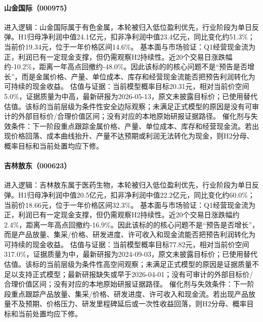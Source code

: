 \paragraph{山金国际（000975）}
进入逻辑：山金国际属于有色金属，本轮被归入低位盈利优先，行业阶段为单日反弹。H1归母净利润中值24.1亿元，扣非净利润中值23.4亿元，同比变化约51.3\%；当前价19.34元，位于一年价格区间14.6\%。
基本面与市场验证：Q1经营现金流为正，利润已有一定现金支撑，但仍需观察H2持续性。近20个交易日涨跌幅约-10.2\%，距离一年高点回撤约-48.0\%。因此该标的的核心问题不是“预告是否增长”，而是金属价格、产量、单位成本、库存和经营现金流能否把预告利润转化为可持续的现金收益。
估值与证据：当前模型概率目标20.31元，相对当前价空间5.0\%，证据质量为中高，最新研报为2026-05-13，原文未披露目标价；已使用替代估值。该标的当前层级为条件性安全边际观察；未满足正式模型的原因是没有可审计的外部目标价/合理价值区间；没有对应的本地原始研报证据路径。
催化剂与失效条件：下一阶段重点跟踪金属价格、产量、单位成本、库存和经营现金流。若出现价格回落、成本曲线抬升、产量不达预期或利润无法转化为现金，则H2分母、概率目标和当前处置均应下修。

\paragraph{吉林敖东（000623）}
进入逻辑：吉林敖东属于医药生物，本轮被归入低位盈利优先，行业阶段为单日反弹。H1归母净利润中值20.5亿元，扣非净利润中值22.2亿元，同比变化约60.0\%；当前价18.66元，位于一年价格区间32.3\%。
基本面与市场验证：Q1经营现金流为正，利润已有一定现金支撑，但仍需观察H2持续性。近20个交易日涨跌幅约2.4\%，距离一年高点回撤约-16.9\%。因此该标的的核心问题不是“预告是否增长”，而是产品放量、集采/价格、研发进度、许可收入和现金流能否把预告利润转化为可持续的现金收益。
估值与证据：当前模型概率目标77.82元，相对当前价空间317.0\%，证据质量为中，最新研报为2024-09-03，原文未披露目标价；已使用替代估值。该标的当前层级为条件性高空间观察；未满足正式模型的原因是证据质量不足以支持正式模型；最新研报缺失或早于2026-04-01；没有可审计的外部目标价/合理价值区间；没有对应的本地原始研报证据路径。
催化剂与失效条件：下一阶段重点跟踪产品放量、集采/价格、研发进度、许可收入和现金流。若出现产品放量不及预期、价格压力、研发里程碑延后或一次性收益回落，则H2分母、概率目标和当前处置均应下修。

